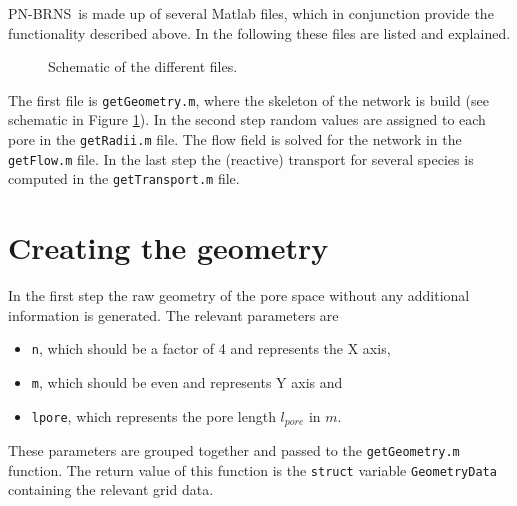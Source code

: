 \documentclass[12pt]{report}
\newcommand*{\PsTricksPath}{pstricks}
\def\QI{{\sc PN-BRNS}}
\begin{document}
\QI\ is made up of several Matlab files, which in conjunction provide the functionality described above. In the following these files are listed and explained.

\begin{figure}[ht]
	\centering
	
	\caption{Schematic of the different files.}
	\label{fig:Overview}
\end{figure}

The first file is {\tt getGeometry.m}, where the skeleton of the network is build (see schematic in Figure \ref{fig:Overview}). In the second step random values are assigned to each pore in the {\tt getRadii.m} file. The flow field is solved for the network in the {\tt getFlow.m} file. In the last step the (reactive) transport for several species is computed in the {\tt getTransport.m} file.

\section{Creating the geometry}

In the first step the raw geometry of the pore space without any additional information is generated. The relevant parameters are

\begin{itemize}
	\item {\tt n}, which should be a factor of 4 and represents the X axis,
	\item {\tt m}, which should be even and represents Y axis and
	\item {\tt l\textunderscore pore}, which represents the pore length $l_{pore}$ in $m$.
\end{itemize}

These parameters are grouped together and passed to the {\tt getGeometry.m} function. The return value of this function is the {\tt struct} variable {\tt GeometryData} containing the relevant grid data.
\end{document}
